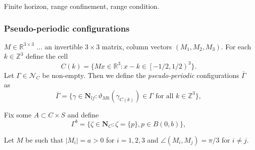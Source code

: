 \documentclass[c, 10pt]{beamer}
\begin{document}
\begin{frame}[noframenumbering]
Finite horizon, range confinement, range condition.

\end{frame}


\begin{frame}\frametitle{Pseudo-periodic configurations}

$M\in\mathbb R^{3\times 3}$ $\dots$ an invertible $3\times 3$ matrix, column vectors $(M_1,M_2,M_3)$. \newline
	For each $k \in \mathbb Z^3$ define the cell
$$C(k) =  \{Mx \in \mathbb R^3: x-k \in \left[ -1/2, 1/2 \right)^3 \}.$$
Let $\Gamma \in \mathcal N_C$ be non-empty. Then we define the \textit{pseudo-periodic} configurations $\bar \Gamma$ as
$$\bar \Gamma = \{ \gamma \in \mathbf N_{lf}: \vartheta_{Mk}(\gamma_{C(k)}) \in \Gamma \text{ for all } k \in \mathbb Z^3 \},$$

\noindent Fix some $A \subset C\times S$ and define
	$$\Gamma^b = \{\zeta \in \mathbf N_C: \zeta = \{p\}, p \in B(0,b)\},$$

Let $M$ be such that $|M_i| = a > 0$ for $i=1,2,3$ and $\angle(M_i,M_j) = \pi / 3$ for $i\neq j$.




\end{frame}
\end{document}
